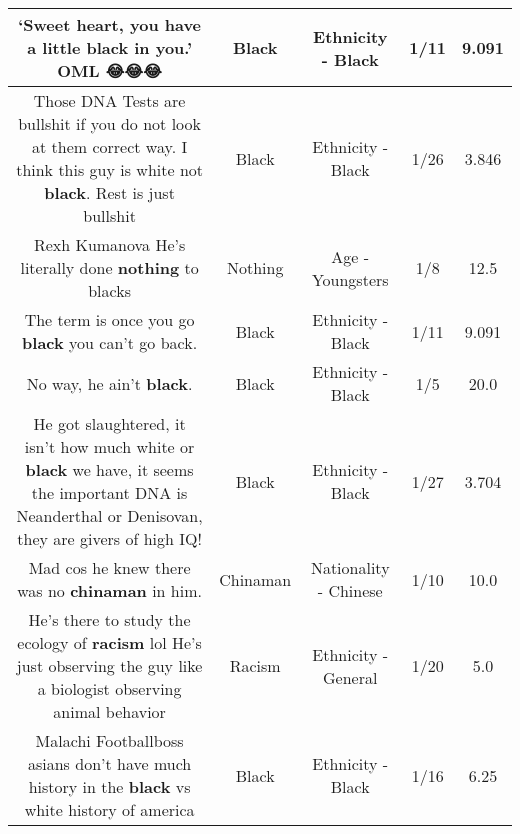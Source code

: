 \documentclass[11pt]{article}
\newlength\mylength
\begin{document}
\begin{center}
\begin{longtable}{|C{.65\mylength}|C{.30\mylength}|C{.12\mylength}|C{.12\mylength}|C{.12\mylength}|}
  \small ‘Sweet heart, you have a little \textbf{black} in you.' OML 😂😂😂\normalsize   & Black & Ethnicity - Black & 1/11 & 9.091 \\  \hline
  \small Those DNA Tests are bullshit if you do not look at them correct way. I think this guy is white not \textbf{black}. Rest is just bullshit\normalsize   & Black & Ethnicity - Black & 1/26 & 3.846 \\  \hline
  \small Rexh Kumanova He's literally done \textbf{nothing} to blacks\normalsize   & Nothing & Age - Youngsters & 1/8 & 12.5 \\  \hline
  \small The term is once you go \textbf{black} you can't go back.\normalsize   & Black & Ethnicity - Black & 1/11 & 9.091 \\  \hline
  \small No way, he ain't \textbf{black}.\normalsize   & Black & Ethnicity - Black & 1/5 & 20.0 \\  \hline
  \small He got slaughtered, it isn't how much white or \textbf{black} we have, it seems the important DNA is Neanderthal or Denisovan, they are givers of high IQ!\normalsize   & Black & Ethnicity - Black & 1/27 & 3.704 \\  \hline
  \small Mad cos he knew there was no \textbf{chinaman} in him.\normalsize   & Chinaman & Nationality - Chinese & 1/10 & 10.0 \\  \hline
  \small He's there to study the ecology of \textbf{racism} lol He's just observing the guy like a biologist observing animal behavior\normalsize   & Racism & Ethnicity - General & 1/20 & 5.0 \\  \hline
  \small Malachi   Footballboss asians don't have much history in the \textbf{black} vs white history of america\normalsize   & Black & Ethnicity - Black & 1/16 & 6.25 \\  \hline

\end{longtable}
\end{center}
\end{document}
